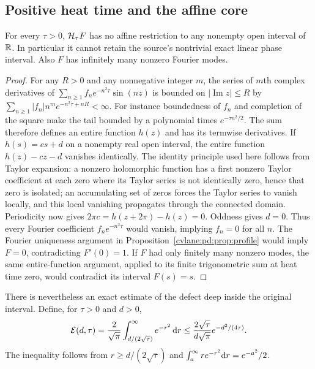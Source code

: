 \subsection{Positive heat time and the affine core}

\begin{cvlanepdproposition}\label{cvlane:pd:prop:analytic}
For every $\tau>0$, $\mathcal H_\tau F$ has no affine restriction to any nonempty
open interval of $\mathbb R$. In particular it cannot retain the source's
nontrivial exact linear phase interval. Also $F$ has infinitely many
nonzero Fourier modes.
\end{cvlanepdproposition}
\begin{proof}
For any $R>0$ and any nonnegative integer $m$, the series of $m$th complex
derivatives of
$\sum_{n\geq1}f_ne^{-n^2\tau}\sin(nz)$ is bounded on
$|\operatorname{Im}z|\leq R$ by
$\sum_{n\geq1}|f_n|n^me^{-n^2\tau+nR}<\infty$.
For instance boundedness of $f_n$ and completion of the square make the
tail bounded by a polynomial times $e^{-\tau n^2/2}$.
The sum therefore defines an entire function $h(z)$ and has its
termwise derivatives. If $h(s)=cs+d$ on a nonempty real open interval,
the entire function $h(z)-cz-d$ vanishes identically. The identity
principle used here follows from Taylor expansion: a nonzero holomorphic
function has a first nonzero Taylor coefficient at each zero where its
Taylor series is not identically zero, hence that zero is isolated;
an accumulating set of zeros forces the Taylor series to vanish locally,
and this local vanishing propagates through the connected domain.
Periodicity now gives $2\pi c=h(z+2\pi)-h(z)=0$. Oddness gives $d=0$.
Thus every Fourier coefficient $f_ne^{-n^2\tau}$ would vanish, implying
$f_n=0$ for all $n$. The Fourier uniqueness argument in
Proposition~\ref{cvlane:pd:prop:profile} would imply $F=0$, contradicting $F'(0)=1$.
If $F$ had only finitely many nonzero modes, the same entire-function
argument, applied to its finite trigonometric sum at heat time zero,
would contradict its interval $F(s)=s$.
\end{proof}

There is nevertheless an exact estimate of the defect deep inside the
original interval. Define, for $\tau>0$ and $d>0$,
\begin{equation}\label{cvlane:pd:eq:tail}
 \mathcal E(d,\tau)=\frac{2}{\sqrt\pi}
          \int_{d/(2\sqrt\tau)}^\infty e^{-r^2}\,\mathrm d r
 \leq\frac{2\sqrt\tau}{d\sqrt\pi}e^{-d^2/(4\tau)}.
\end{equation}
The inequality follows from $r\geq d/(2\sqrt\tau)$ and
$\int_a^\infty r e^{-r^2}\mathrm d r=e^{-a^2}/2$.

